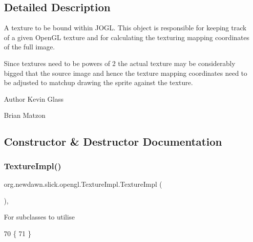\subsection{Detailed Description}
A texture to be bound within J\+O\+GL. This object is responsible for keeping track of a given Open\+GL texture and for calculating the texturing mapping coordinates of the full image.

Since textures need to be powers of 2 the actual texture may be considerably bigged that the source image and hence the texture mapping coordinates need to be adjusted to matchup drawing the sprite against the texture.

\begin{DoxyAuthor}{Author}
Kevin Glass 

Brian Matzon 
\end{DoxyAuthor}


\subsection{Constructor \& Destructor Documentation}
\mbox{\label{classorg_1_1newdawn_1_1slick_1_1opengl_1_1_texture_impl_aec5b5fc2b1fb2633b6691e99a08ac43c}} 
\subsubsection{\texorpdfstring{Texture\+Impl()}{TextureImpl()}\hspace{0.1cm}{\footnotesize\ttfamily [1/2]}}
{\footnotesize\ttfamily org.\+newdawn.\+slick.\+opengl.\+Texture\+Impl.\+Texture\+Impl (\begin{DoxyParamCaption}{ }\end{DoxyParamCaption})\hspace{0.3cm}{\ttfamily [inline]}, {\ttfamily [protected]}}

For subclasses to utilise 
\begin{DoxyCode}
70                             \{   
71     \}
\end{DoxyCode}
\mbox{\label{classorg_1_1newdawn_1_1slick_1_1opengl_1_1_texture_impl_a04f8674fa2ba26890ca2bf8c967db81c}} 

